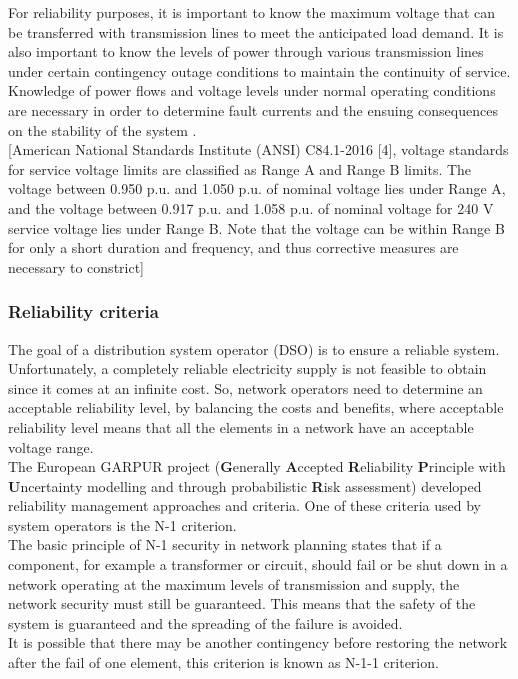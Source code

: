 For reliability purposes, it is important to know the maximum voltage that can be
transferred with transmission lines to meet the anticipated load demand. It is also important to know the levels of power through various transmission lines under certain contingency outage conditions to maintain the continuity of service. Knowledge of power flows and voltage levels under normal operating conditions are necessary in order to determine fault currents and the ensuing consequences on the stability of the system \cite{eps}. \\


[American National Standards Institute (ANSI) C84.1-2016 [4], voltage standards for service voltage limits are classified as Range A and Range B limits. The voltage between 0.950 p.u. and 1.050 p.u. of nominal voltage lies under Range A, and the voltage between 0.917 p.u. and 1.058 p.u. of nominal voltage for 240 V service voltage lies under Range B. Note that the voltage can be within Range B for only a short duration and frequency, and thus corrective measures are necessary to constrict]


\subsubsection{Reliability criteria}
\label{ssec:n1cri}
The goal of a distribution system operator (\gls{DSO}) is to ensure a reliable system. Unfortunately, a completely reliable electricity supply is not feasible to obtain since it comes at an infinite cost. So, network operators need to determine an acceptable reliability level, by balancing the costs and benefits, where acceptable reliability level means that all the elements in a network have an acceptable voltage range. \\

The European \gls{GARPUR} project (\textbf{G}enerally \textbf{A}ccepted \textbf{R}eliability \textbf{P}rinciple with \textbf{U}ncertainty modelling and through probabilistic \textbf{R}isk assessment) developed reliability management approaches and criteria. One of these criteria used by system operators is the N-1 criterion. \\

The basic principle of N-1 security in network planning states that if a component, for example a transformer or circuit, should fail or be shut down in a network operating at the maximum levels of transmission and supply, the network security must still be guaranteed. This means that the safety of the system is guaranteed and the spreading of the failure is avoided. \\
It is possible that there may be another contingency before restoring the network after the fail of one element, this criterion is known as N-1-1 criterion.  \\

